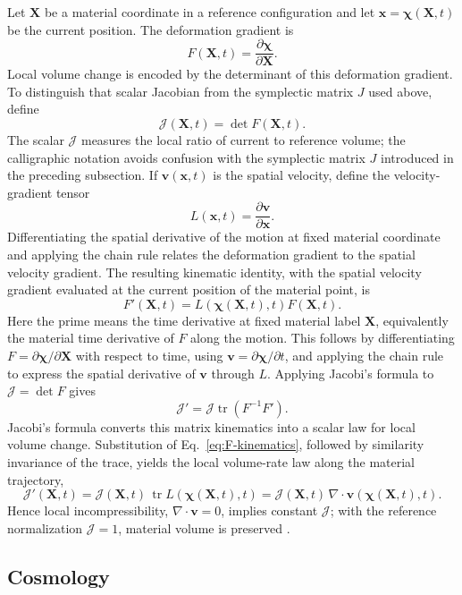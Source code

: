 \documentclass[11pt,a4paper]{article}
\newcommand{\be}{\begin{equation}}
\newcommand{\ee}{\end{equation}}
\newcommand{\lb}[1]{\label{#1}}
\DeclareMathOperator{\tr}{tr}
\theoremstyle{definition}
\numberwithin{equation}{section}
\begin{document}
Let $\mathbf{X}$ be a material coordinate in a reference configuration and let $\mathbf{x}=\boldsymbol{\chi}(\mathbf{X},t)$ be the current position. The deformation gradient is
\be
F(\mathbf{X},t)
=
\frac{\partial\boldsymbol{\chi}}{\partial\mathbf{X}}.
\lb{eq:def-gradient}
\ee
Local volume change is encoded by the determinant of this deformation gradient. To distinguish that scalar Jacobian from the symplectic matrix $J$ used above, define
\be
\mathcal{J}(\mathbf{X},t)=\det F(\mathbf{X},t).
\lb{eq:def-jacobian}
\ee
The scalar $\mathcal{J}$ measures the local ratio of current to reference volume; the calligraphic notation avoids confusion with the symplectic matrix $J$ introduced in the preceding subsection. If $\mathbf{v}(\mathbf{x},t)$ is the spatial velocity, define the velocity-gradient tensor
\be
L(\mathbf{x},t)
=
\frac{\partial\mathbf{v}}{\partial\mathbf{x}}.
\lb{eq:velocity-gradient}
\ee
Differentiating the spatial derivative of the motion at fixed material coordinate and applying the chain rule relates the deformation gradient to the spatial velocity gradient. The resulting kinematic identity, with the spatial velocity gradient evaluated at the current position of the material point, is
\be
F'(\mathbf X,t)
=
L(\boldsymbol{\chi}(\mathbf X,t),t)F(\mathbf X,t).
\lb{eq:F-kinematics}
\ee
Here the prime means the time derivative at fixed material label $\mathbf{X}$, equivalently the material time derivative of $F$ along the motion. This follows by differentiating $F=\partial\boldsymbol{\chi}/\partial\mathbf{X}$ with respect to time, using $\mathbf{v}=\partial\boldsymbol{\chi}/\partial t$, and applying the chain rule to express the spatial derivative of $\mathbf{v}$ through $L$. Applying Jacobi's formula to $\mathcal{J}=\det F$ gives
\be
\mathcal{J}'
=
\mathcal{J}\tr(F^{-1}F').
\lb{eq:J-jacobi}
\ee
Jacobi's formula converts this matrix kinematics into a scalar law for local volume change. Substitution of Eq.~\eqref{eq:F-kinematics}, followed by similarity invariance of the trace, yields the local volume-rate law along the material trajectory,
\be
\mathcal{J}'(\mathbf X,t)
=
\mathcal{J}(\mathbf X,t)\,\tr L(\boldsymbol{\chi}(\mathbf X,t),t)
=
\mathcal{J}(\mathbf X,t)\,\nabla\cdot\mathbf{v}(\boldsymbol{\chi}(\mathbf X,t),t).
\lb{eq:J-continuum}
\ee
Hence local incompressibility, $\nabla\cdot\mathbf{v}=0$, implies constant $\mathcal{J}$; with the reference normalization $\mathcal{J}=1$, material volume is preserved \cite{gurtin2010}.

\subsection{Cosmology}
\end{document}
